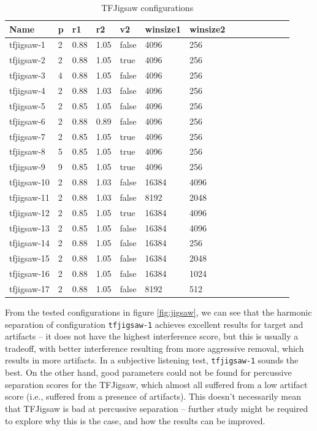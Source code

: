 \documentclass[letter,12pt]{article}
\begin{document}
\begin{table}[ht]
	\centering
\begin{tabular}{ |l|l|l|l|l|l|l|c|c|c|c|c|c|c| }
	 \hline
	  Name & p & r1 & r2 & v2 & winsize1 & winsize2 \\
	 \hline
	 \hline
	 tfjigsaw-1 & 2 & 0.88 & 1.05 & false & 4096 & 256 \\
	 \hline
	 tfjigsaw-2 & 2 & 0.88 & 1.05 & true & 4096 & 256 \\
	 \hline
	 tfjigsaw-3 & 4 & 0.88 & 1.05 & false & 4096 & 256 \\
	 \hline
	 tfjigsaw-4 & 2 & 0.88 & 1.03 & false & 4096 & 256 \\
	 \hline
	 tfjigsaw-5 & 2 & 0.85 & 1.05 & false & 4096 & 256 \\
	 \hline
	 tfjigsaw-6 & 2 & 0.88 & 0.89 & false & 4096 & 256 \\
	 \hline
	 tfjigsaw-7 & 2 & 0.85 & 1.05 & true & 4096 & 256 \\
	 \hline
	 tfjigsaw-8 & 5 & 0.85 & 1.05 & true & 4096 & 256 \\
	 \hline
	 tfjigsaw-9 & 9 & 0.85 & 1.05 & true & 4096 & 256 \\
	 \hline
	 tfjigsaw-10 & 2 & 0.88 & 1.03 & false & 16384 & 4096 \\
	 \hline
	 tfjigsaw-11 & 2 & 0.88 & 1.03 & false & 8192 & 2048 \\
	 \hline
	 tfjigsaw-12 & 2 & 0.85 & 1.05 & true & 16384 & 4096 \\
	 \hline
	 tfjigsaw-13 & 2 & 0.85 & 1.05 & false & 16384 & 4096 \\
	 \hline
	 tfjigsaw-14 & 2 & 0.88 & 1.05 & false & 16384 & 256 \\
	 \hline
	 tfjigsaw-15 & 2 & 0.88 & 1.05 & false & 16384 & 2048 \\
	 \hline
	 tfjigsaw-16 & 2 & 0.88 & 1.05 & false & 16384 & 1024 \\
	 \hline
	 tfjigsaw-17 & 2 & 0.88 & 1.05 & false & 8192 & 512 \\
	 \hline
\end{tabular}
	\caption{TFJigsaw configurations}
	\label{table:round2jigsaw}
\end{table}

From the tested configurations in figure \ref{fig:jigsaw}, we can see that the harmonic separation of configuration \Verb#tfjigsaw-1# achieves excellent results for target and artifacts -- it does not have the highest interference score, but this is usually a tradeoff, with better interference resulting from more aggressive removal, which results in more artifacts. In a subjective listening test, \Verb#tfjigsaw-1# sounds the best. On the other hand, good parameters could not be found for percussive separation scores for the TFJigsaw, which almost all suffered from a low artifact score (i.e., suffered from a presence of artifacts). This doesn't necessarily mean that TFJigsaw  is bad at percussive separation -- further study might be required to explore why this is the case, and how the results can be improved.
\end{document}
